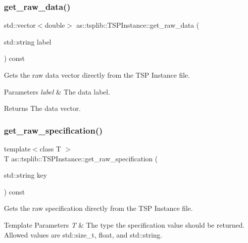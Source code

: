 \subsubsection{\texorpdfstring{get\+\_\+raw\+\_\+data()}{get\_raw\_data()}}
{\footnotesize\ttfamily std\+::vector$<$double$>$ as\+::tsplib\+::\+T\+S\+P\+Instance\+::get\+\_\+raw\+\_\+data (\begin{DoxyParamCaption}\item[{std\+::string}]{label }\end{DoxyParamCaption}) const\hspace{0.3cm}{\ttfamily [inline]}}



Gets the raw data vector directly from the T\+SP Instance file. 


\begin{DoxyParams}{Parameters}
{\em label} & The data label. \\
\hline
\end{DoxyParams}
\begin{DoxyReturn}{Returns}
The data vector. 
\end{DoxyReturn}
\mbox{\label{classas_1_1tsplib_1_1TSPInstance_a24f6eeee5dba6517265a9211da0b4962}} 
\subsubsection{\texorpdfstring{get\+\_\+raw\+\_\+specification()}{get\_raw\_specification()}}
{\footnotesize\ttfamily template$<$class T $>$ \\
T as\+::tsplib\+::\+T\+S\+P\+Instance\+::get\+\_\+raw\+\_\+specification (\begin{DoxyParamCaption}\item[{std\+::string}]{key }\end{DoxyParamCaption}) const\hspace{0.3cm}{\ttfamily [inline]}}



Gets the raw specification directly from the T\+SP Instance file. 


\begin{DoxyTemplParams}{Template Parameters}
{\em T} & The type the specification value should be returned. Allowed values are std\+::size\+\_\+t, float, and std\+::string. \\
\hline
\end{DoxyTemplParams}

